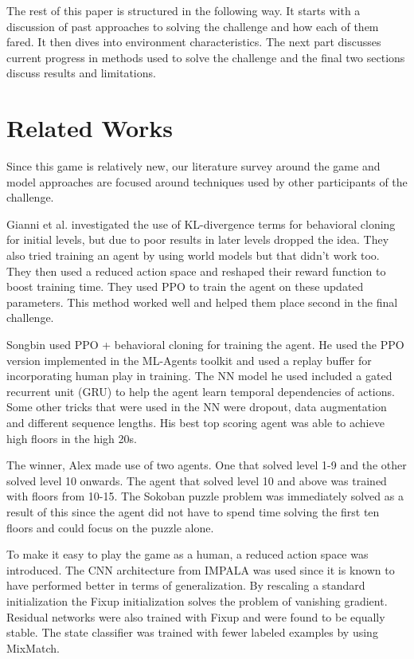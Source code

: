 \documentclass[conference]{IEEEtran}
\begin{document}
The rest of this paper is structured in the following way. It starts with a discussion of past approaches to solving the challenge and how each of them fared. It then dives into environment characteristics. The next part discusses current progress in methods used to solve the challenge and the final two sections discuss results and limitations.

\section{Related Works}

Since this game is relatively new, our literature survey around the game and model approaches are focused around techniques used by other participants of the challenge.

Gianni et al. \cite{Unity-tech-blog} investigated the use of KL-divergence terms for behavioral cloning for initial levels, but due to poor results in later levels dropped the idea. They also tried training an agent by using world models but that didn't work too. They then used a reduced action space and reshaped their reward function to boost training time. They used PPO to train the agent on these updated parameters. This method worked well and helped them place second in the final challenge. 

Songbin \cite{Unity-tech-blog} used PPO + behavioral cloning for training the agent. He used the PPO version implemented in the ML-Agents toolkit and used a replay buffer for incorporating human play in training. The NN model he used included a gated recurrent unit (GRU) to help the agent learn temporal dependencies of actions. Some other tricks that were used in the NN were dropout, data augmentation and different sequence lengths. His best top scoring agent was able to achieve high floors in the high 20s. 

The winner, Alex \cite{Pickled-ml-blog} made use of two agents. One that solved level 1-9 and the other solved level 10 onwards. The agent that solved level 10 and above was trained with floors from 10-15. The Sokoban puzzle problem was immediately solved as a result of this since the agent did not have to spend time solving the first ten floors and could focus on the puzzle alone.

To make it easy to play the game as a human, a reduced action space was introduced.  The CNN architecture from IMPALA was used since it is known to have performed better in terms of generalization. By rescaling a standard initialization the Fixup initialization \cite{Zhang-et-al} solves the problem of vanishing gradient. Residual networks were also trained with Fixup and were found to be equally stable. The state classifier was trained with fewer labeled examples by using MixMatch.
\end{document}
